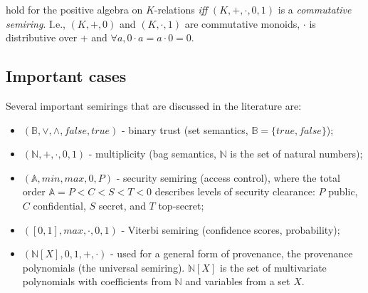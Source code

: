 hold for the positive algebra on $K$-relations \textit{iff} $(K,+,\cdot,0,1)$ is a \textit{commutative semiring}.
I.e., $(K,+,0)$ and $(K,\cdot,1)$ are commutative monoids\footnotemark,
$\cdot$ is distributive over + and $\forall a, 0 \cdot a = a \cdot 0 = 0$.

\subsection{Important cases} Several important semirings that are discussed in the literature \cite{green2007provenance, Karvounarakis:2012:SDQ:2380776.2380778, Senellart2017} are:
\begin{itemize}
    \item $(\mathbb{B}, \vee, \wedge, false, true)$ - binary trust (set semantics, $\mathbb{B} = \{true, false\}$);
    \item $(\mathbb{N}, +, \cdot, 0, 1)$ - multiplicity (bag semantics, $\mathbb{N}$ is the set of natural numbers);
    \item $(\mathbb{A}, min, max, 0, P)$ - security semiring (access control), where the total order $\mathbb{A}=P<C<S<T<0$ describes levels of security clearance: $P$ public, $C$ confidential, $S$ secret, and $T$ top-secret;
    \item $([0,1], max, \cdot, 0, 1)$ - Viterbi semiring (confidence scores, probability);
    \item $(\mathbb{N}[X], 0, 1, +, \cdot)$ - used for a general form of provenance, the provenance polynomials (the universal semiring). $\mathbb{N}[X]$ is the set of multivariate polynomials with coefficients from $\mathbb{N}$ and variables from a set $X$.
\end{itemize}


